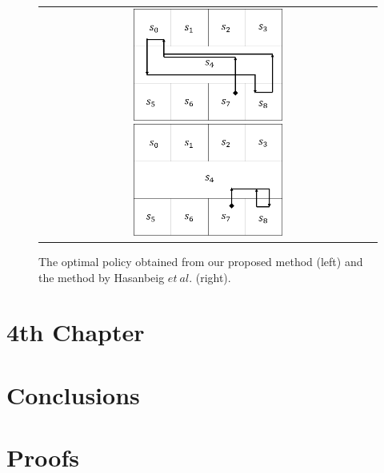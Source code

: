 \documentclass[a4j,12pt,oneside,openany,english]{jsbook}
\begin{document}
\begin{figure}[tbp]
	\centering
	\begin{tabular}{c}

		\begin{minipage}{0.499\hsize}
			\includegraphics[bb=0 0 341 256, height = 3.7cm, width=5.5cm]{proposed_policy.png}
		\end{minipage}

		\begin{minipage}{0.499\hsize}
			\centering
			\includegraphics[bb=0 0 341 257, height = 3.7cm, width=5.5cm]{Abate_policy.png}
		\end{minipage}
	\end{tabular}

	\caption{The optimal policy obtained from our proposed method (left) and the method by Hasanbeig $et\ al.$\cite{HAK2019} (right).}
	\label{optimal}
\end{figure}

\chapter{4th Chapter}

\chapter{Conclusions}

\appendix
\chapter{Proofs}
\end{document}
